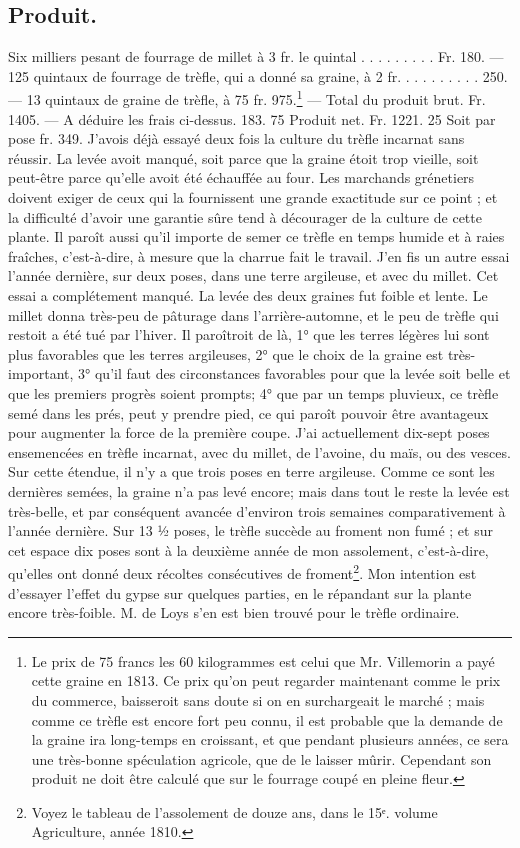 \subsection{Produit.}
Six milliers pesant de fourrage de millet à 3 fr. le quintal . . . . . . . . . Fr. 180. —
125 quintaux de fourrage de trèfle, qui a donné sa graine, à 2 fr. . . . . . . . . . 250. —
13 quintaux de graine de trèfle, à 75 fr. 975.\footnote{Le prix de 75 francs les 60 kilogrammes est celui que Mr. Villemorin a payé cette graine en 1813. Ce prix qu'on peut regarder maintenant comme le prix du commerce, baisseroit sans doute si on en surchargeait le marché ; mais comme ce trèfle est encore fort peu connu, il est probable que la demande de la graine ira long-temps en croissant, et que pendant plusieurs années, ce sera une très-bonne spéculation agricole, que de le laisser mûrir. Cependant son produit ne doit être calculé que sur le fourrage coupé en pleine fleur.} —
Total du produit brut. Fr. 1405. —
A déduire les frais ci-dessus. 183. 75
Produit net. Fr. 1221. 25
Soit par pose fr. 349.
J'avois déjà essayé deux fois la culture du trèfle incarnat sans réussir. La levée avoit manqué, soit parce que la graine étoit trop vieille, soit peut-être parce qu'elle avoit été échauffée au four. Les marchands grénetiers doivent exiger de ceux qui la fournissent une grande exactitude sur ce point ; et la\setcounter{page}{266} difficulté d'avoir une garantie sûre tend à décourager de la culture de cette plante. Il paroît aussi qu'il importe de semer ce trèfle en temps humide et à raies fraîches, c'est-à-dire, à mesure que la charrue fait le travail.
J'en fis un autre essai l'année dernière, sur deux poses, dans une terre argileuse, et avec du millet. Cet essai a complétement manqué. La levée des deux graines fut foible et lente. Le millet donna très-peu de pâturage dans l'arrière-automne, et le peu de trèfle qui restoit a été tué par l'hiver. Il paroîtroit de là, 1° que les terres légères lui sont plus favorables que les terres argileuses, 2° que le choix de la graine est très-important, 3° qu'il faut des circonstances favorables pour que la levée soit belle et que les premiers progrès soient prompts; 4° que par un temps pluvieux, ce trèfle semé dans les prés, peut y prendre pied, ce qui paroît pouvoir être avantageux pour augmenter la force de la première coupe.
J'ai actuellement dix-sept poses ensemencées en trèfle incarnat, avec du millet, de l'avoine, du maïs, ou des vesces. Sur cette étendue, il n'y a que trois poses en terre argileuse. Comme ce sont les dernières semées, la graine n'a pas levé encore; mais\setcounter{page}{267} dans tout le reste la levée est très-belle, et par conséquent avancée d'environ trois semaines comparativement à l'année dernière. Sur 13 ½ poses, le trèfle succède au froment non fumé ; et sur cet espace dix poses sont à la deuxième année de mon assolement, c'est-à-dire, qu'elles ont donné deux récoltes consécutives de froment\footnote{Voyez le tableau de l'assolement de douze ans, dans le 15ᵉ. volume Agriculture, année 1810.}. Mon intention est d'essayer l'effet du gypse sur quelques parties, en le répandant sur la plante encore très-foible. M. de Loys s'en est bien trouvé pour le trèfle ordinaire.
